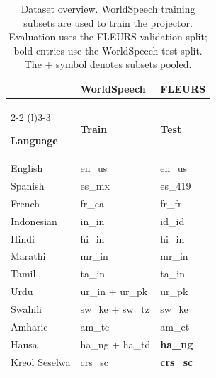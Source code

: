 \documentclass[11pt]{article}
\begin{document}
\begin{table}[t]
\centering

\setlength{\tabcolsep}{5pt}
\renewcommand{\arraystretch}{1.08}

\begin{tabular}{@{}lll@{}}
\toprule
& \textbf{WorldSpeech} & \textbf{FLEURS} \\
\cmidrule(lr){2-2} \cmidrule(l){3-3}

\textbf{Language} & \textbf{Train} & \textbf{Test} \\
\midrule
English & en\_us & en\_us   \\
Spanish & es\_mx & es\_419  \\
French & fr\_ca & fr\_fr   \\
Indonesian & in\_in & id\_id  \\
\midrule
Hindi & hi\_in & hi\_in   \\
Marathi & mr\_in & mr\_in   \\
Tamil & ta\_in & ta\_in   \\
Urdu & ur\_in $+$ ur\_pk & ur\_pk   \\
\midrule
Swahili & sw\_ke $+$ sw\_tz & sw\_ke   \\
Amharic & am\_te & am\_et   \\
Hausa & ha\_ng $+$ ha\_td  & \textbf{ha\_ng}  \\
Kreol Seselwa & crs\_sc & \textbf{crs\_sc} \\

\bottomrule
\end{tabular}

\caption{Dataset overview. WorldSpeech training subsets are used to train the
projector. Evaluation uses the FLEURS validation split; bold entries use the
WorldSpeech test split. The \(+\) symbol denotes subsets pooled.}



\label{tab:dataset-overview}
\end{table}
\end{document}

